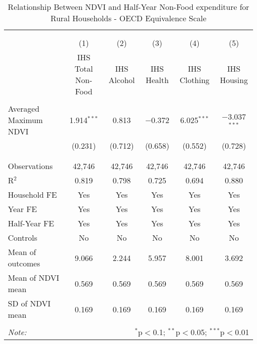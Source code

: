 
\begin{table}[!htbp] \centering 
  \caption{Relationship Between NDVI and Half-Year Non-Food expenditure for Rural Households - OECD Equivalence Scale} 
  \label{ndvi_table_4_1_rural.tex} 
\normalsize 
\begin{tabular}{@{\extracolsep{5pt}}lccccc} 
\\[-1.8ex]\hline 
\hline \\[-1.8ex] 
\\[-1.8ex] & (1) & (2) & (3) & (4) & (5)\\ 
 & IHS Total Non-Food & IHS Alcohol & IHS Health & IHS Clothing & IHS Housing \\ 
\hline \\[-1.8ex] 
 Averaged Maximum NDVI & 1.914$^{***}$ & 0.813 & $-$0.372 & 6.025$^{***}$ & $-$3.037$^{***}$ \\ 
  & (0.231) & (0.712) & (0.658) & (0.552) & (0.728) \\ 
  & & & & & \\ 
\hline \\[-1.8ex] 
Observations & 42,746 & 42,746 & 42,746 & 42,746 & 42,746 \\ 
R$^{2}$ & 0.819 & 0.798 & 0.725 & 0.694 & 0.880 \\ 
Household FE & Yes & Yes & Yes & Yes & Yes \\ 
Year FE & Yes & Yes & Yes & Yes & Yes \\ 
Half-Year FE & Yes & Yes & Yes & Yes & Yes \\ 
Controls & No & No & No & No & No \\ 
Mean of outcomes & 9.066 & 2.244 & 5.957 & 8.001 & 3.692 \\ 
Mean of NDVI mean & 0.569 & 0.569 & 0.569 & 0.569 & 0.569 \\ 
SD of NDVI mean & 0.169 & 0.169 & 0.169 & 0.169 & 0.169 \\ 
\hline \\[-1.8ex] 
\textit{Note:}  & \multicolumn{5}{r}{$^{*}$p$<$0.1; $^{**}$p$<$0.05; $^{***}$p$<$0.01} \\ 
\end{tabular} 
\end{table} 
